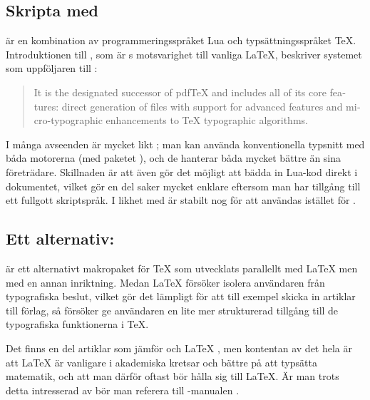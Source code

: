 \documentclass[10pt,../../a4.tex]{subfiles}
\begin{document}
\subsection{Skripta med }
 är en kombination av programmeringsspråket Lua och
typsättningsspråket \TeX. Introduktionen till ,
som är s motsvarighet till vanliga \LaTeX,
beskriver systemet som uppföljaren till \pdfLaTeX:
\begin{quote}
	\begin{english}
		It is the designated successor of pdf\TeX{} and includes all of 
		its core features: direct generation of \PDF files with support 
		for advanced \PDF features and micro-typographic enhancements to 
		\TeX{} typographic algorithms.

		\nopagebreak
		\hfill\textcite{Gonnard10}\hspace{-1ex}%
	\end{english}
\end{quote}

I många avseenden är  mycket likt \XeTeX; man kan använda
konventionella typsnitt med båda motorerna (med paketet ), 
och de hanterar båda \UTF 
mycket bättre än sina företrädare. Skillnaden är att 
även gör det möjligt att bädda in Lua-kod direkt i dokumentet, vilket gör
en del saker mycket enklare eftersom man har tillgång till ett fullgott
skriptspråk. I likhet med \XeTeX{} är  stabilt nog för att
användas istället för \pdfLaTeX.

\subsection{Ett alternativ: }
 är ett alternativt makropaket för \TeX{} som utvecklats
parallellt med \LaTeX{} men med en annan inriktning. Medan \LaTeX{}
försöker isolera användaren från typografiska beslut, vilket gör det
lämpligt för att till exempel skicka in artiklar till förlag, så
försöker  ge användaren en lite mer strukturerad tillgång
till de typografiska funktionerna i \TeX.

Det finns en del artiklar som jämför  och \LaTeX{}
\parencite[till exempel][]{Hoekwater98}, men kontentan av det hela är att
\LaTeX{} är vanligare i akademiska kretsar och bättre på att typsätta
matematik, och att man därför oftast bör hålla sig till \LaTeX. Är man
trots detta intresserad av  bör man referera till
-manualen \parencite{Hagen01}.
\end{document}

